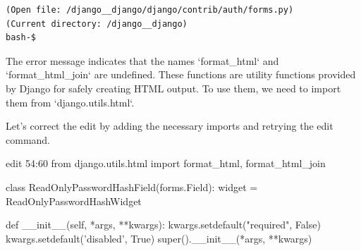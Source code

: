 {\begin{observationbox}
\begin{Verbatim}[breaklines=true, breakanywhere=true]
(Open file: /django__django/django/contrib/auth/forms.py)
(Current directory: /django__django)
bash-$
\end{Verbatim}
\end{observationbox}
\begin{agentbox}
The error message indicates that the names `format\_html` and `format\_html\_join` are undefined. These functions are utility functions provided by Django for safely creating HTML output. To use them, we need to import them from `django.utils.html`.



Let's correct the edit by adding the necessary imports and retrying the edit command.



\hrulefill
\begin{CodeVerbatim}[breaklines=true, breakanywhere=true]
edit 54:60
from django.utils.html import format_html, format_html_join

class ReadOnlyPasswordHashField(forms.Field):
    widget = ReadOnlyPasswordHashWidget

    def __init__(self, *args, **kwargs):
        kwargs.setdefault("required", False)
        kwargs.setdefault('disabled', True)
        super().__init__(*args, **kwargs)


\end{CodeVerbatim}
\end{agentbox}}
